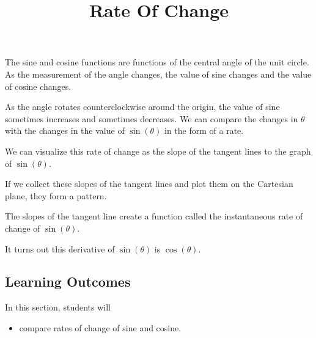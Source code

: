 \documentclass{ximera}
\title{Rate Of Change}
\begin{document}
\begin{abstract}
%
\end{abstract}
\maketitle




The sine and cosine functions are functions of the central angle of the unit circle.  As the measurement of the angle changes, the value of sine changes and the value of cosine changes.  


As the angle rotates counterclockwise around the origin, the value of sine sometimes increases and sometimes decreases.  We can compare the changes in $\theta$ with the changes in the value of $\sin(\theta)$ in the form of a rate. 

We can visualize this rate of change as the slope of the tangent lines to the graph of $\sin(\theta)$.

If we collect these slopes of the tangent lines and plot them on the Cartesian plane, they form a pattern.


The slopes of the tangent line create a function called the instantaneous rate of change of $\sin(\theta)$.

It turns out this derivative of $\sin(\theta)$ is $\cos(\theta)$.












\subsection{Learning Outcomes}

\begin{sectionOutcomes}
In this section, students will 

\begin{itemize}
\item compare rates of change of sine and cosine.
\end{itemize}
\end{sectionOutcomes}
\end{document}

